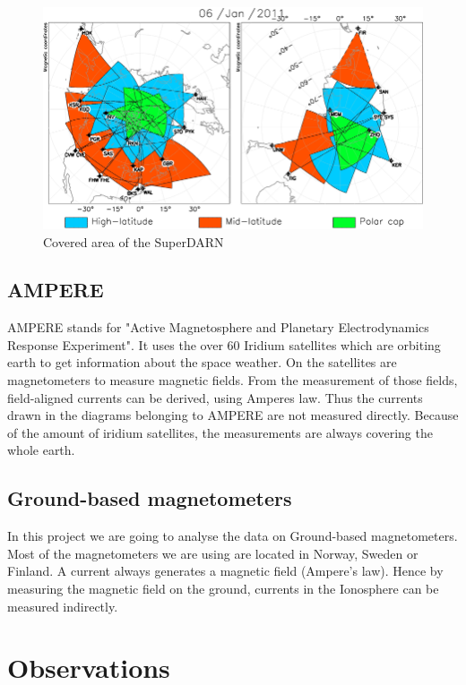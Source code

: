 \documentclass[10pt,a4paper]{article}
\begin{document}
\begin{figure}[h]
	\includegraphics[scale = 1.5]{sd_1.png}
	\centering
	\caption{Covered area of the SuperDARN}
	\label{s1}
\end{figure}

\subsection{AMPERE}

AMPERE stands for "Active Magnetosphere and Planetary Electrodynamics Response Experiment". It uses the over 60  Iridium satellites which are orbiting earth to get information about the space weather. On the satellites are magnetometers to measure magnetic fields. From the measurement of those fields, field-aligned currents can be derived, using Amperes law. Thus the currents drawn in the diagrams belonging to AMPERE are not measured directly. Because of the amount of iridium satellites, the measurements are always covering the whole earth.

\subsection{Ground-based magnetometers}

In this project we are going to analyse the data on Ground-based magnetometers. Most of the magnetometers we are using are located in Norway, Sweden or Finland. A current always generates a magnetic field (Ampere's law). Hence by measuring the magnetic field on the ground, currents in the Ionosphere can be measured indirectly.

\section{Observations}
\end{document}
